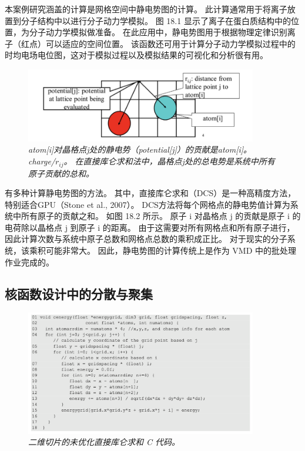 本案例研究涵盖的计算是网格空间中静电势图的计算。 此计算通常用于将离子放置到分子结构中以进行分子动力学模拟。 
图 18.1 显示了离子在蛋白质结构中的位置，为分子动力学模拟做准备。 
在此应用中，静电势图用于根据物理定律识别离子（红点）可以适应的空间位置。 
该函数还可用于计算分子动力学模拟过程中的时均电场电位图，这对于模拟过程以及模拟结果的可视化和分析很有用。

\begin{figure}[H]
	\centering
	\includegraphics[width=0.9\textwidth]{figs/F18.2.png}
	\caption{\textit{atom[i]对晶格点j处的静电势（potential[j]）的贡献是atom[i]。 charge/$r_{ij}$。 
	在直接库仑求和法中，晶格点j处的总电势是系统中所有原子贡献的总和。}}
\end{figure}

有多种计算静电势图的方法。 其中，直接库仑求和（DCS）是一种高精度方法，特别适合GPU（Stone et al., 2007）。 
DCS方法将每个网格点的静电势值计算为系统中所有原子的贡献之和。 
如图 18.2 所示。 原子 i 对晶格点 j 的贡献是原子 i 的电荷除以晶格点 j 到原子 i 的距离。 
由于这需要对所有网格点和所有原子进行，因此计算次数与系统中原子总数和网格点总数的乘积成正比。 
对于现实的分子系统，该乘积可能非常大。 因此，静电势图的计算传统上是作为 VMD 中的批处理作业完成的。

\subsection{核函数设计中的分散与聚集}
\begin{figure}[H]
	\centering
	\includegraphics[width=0.9\textwidth]{figs/F18.3.png}
	\caption{\textit{二维切片的未优化直接库仑求和 C 代码。}}
\end{figure}

